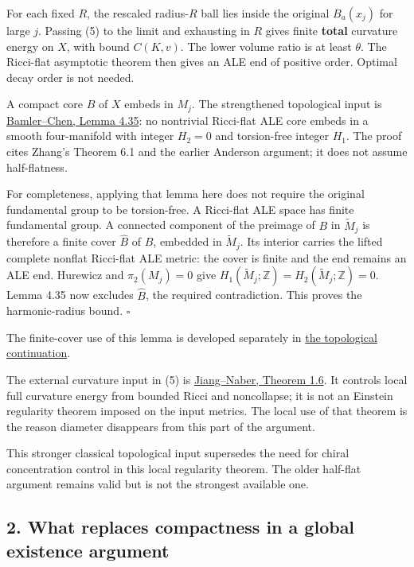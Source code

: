 \documentclass[
  11pt,
]{article}
\begin{document}
For each fixed \(R\), the rescaled radius-\(R\) ball lies inside the
original \(B_a(x_j)\) for large \(j\). Passing (5) to the limit and
exhausting in \(R\) gives finite \textbf{total} curvature energy on
\(X\), with bound \(C(K,v)\). The lower volume ratio is at least
\(\theta\). The Ricci-flat asymptotic theorem then gives an ALE end of
positive order. Optimal decay order is not needed.

A compact core \(B\) of \(X\) embeds in \(M_j\). The strengthened
topological input is
\href{https://arxiv.org/pdf/2305.03154v3}{Bamler--Chen, Lemma 4.35}: no
nontrivial Ricci-flat ALE core embeds in a smooth four-manifold with
integer \(H_2=0\) and torsion-free integer \(H_1\). The proof cites
Zhang's Theorem 6.1 and the earlier Anderson argument; it does not
assume half-flatness.

For completeness, applying that lemma here does not require the original
fundamental group to be torsion-free. A Ricci-flat ALE space has finite
fundamental group. A connected component of the preimage of \(B\) in
\(\widetilde M_j\) is therefore a finite cover \(\widehat B\) of \(B\),
embedded in \(\widetilde M_j\). Its interior carries the lifted complete
nonflat Ricci-flat ALE metric: the cover is finite and the end remains
an ALE end. Hurewicz and \(\pi_2(M_j)=0\) give
\(H_1(\widetilde M_j;\mathbb Z)=H_2(\widetilde M_j;\mathbb Z)=0\). Lemma
4.35 now excludes \(\widehat B\), the required contradiction. This
proves the harmonic-radius bound. \(\square\)

The finite-cover use of this lemma is developed separately in
\href{20260924_ale_boundary_compatibility.md}{the topological
continuation}.

The external curvature input in (5) is
\href{https://arxiv.org/html/1605.05583}{Jiang--Naber, Theorem 1.6}. It
controls local full curvature energy from bounded Ricci and noncollapse;
it is not an Einstein regularity theorem imposed on the input metrics.
The local use of that theorem is the reason diameter disappears from
this part of the argument.

This stronger classical topological input supersedes the need for chiral
concentration control in this local regularity theorem. The older
half-flat argument remains valid but is not the strongest available one.

\hypertarget{what-replaces-compactness-in-a-global-existence-argument}{%
\subsection{2. What replaces compactness in a global existence
argument}\label{what-replaces-compactness-in-a-global-existence-argument}}
\end{document}
